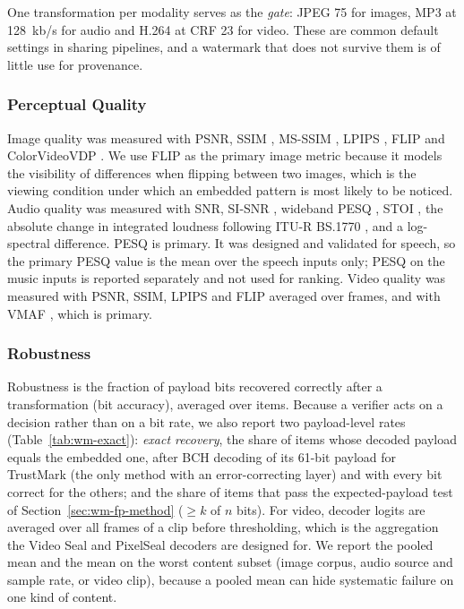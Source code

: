 One transformation per modality serves as the \emph{gate}: JPEG 75 for images, MP3 at 128~kb/s for audio and H.264 at CRF 23 for video. These are common default settings in sharing pipelines, and a watermark that does not survive them is of little use for provenance.

\subsubsection{Perceptual Quality}
Image quality was measured with PSNR, SSIM \cite{wang2004ssim}, MS-SSIM \cite{wang2003msssim}, LPIPS \cite{zhang2018lpips}, FLIP \cite{andersson2020flip} and ColorVideoVDP \cite{mantiuk2024cvvdp}. We use FLIP as the primary image metric because it models the visibility of differences when flipping between two images, which is the viewing condition under which an embedded pattern is most likely to be noticed. Audio quality was measured with SNR, SI-SNR \cite{leroux2019sdr}, wideband PESQ \cite{itu2007p8622}, STOI \cite{taal2011stoi}, the absolute change in integrated loudness following ITU-R BS.1770 \cite{itu2023bs1770}, and a log-spectral difference. PESQ is primary. It was designed and validated for speech, so the primary PESQ value is the mean over the  speech inputs only; PESQ on the  music inputs is reported separately and not used for ranking. Video quality was measured with PSNR, SSIM, LPIPS and FLIP averaged over frames, and with VMAF \cite{rassool2017vmaf}, which is primary.

\subsubsection{Robustness}
Robustness is the fraction of payload bits recovered correctly after a transformation (bit accuracy), averaged over items. Because a verifier acts on a decision rather than on a bit rate, we also report two payload-level rates (Table~\ref{tab:wm-exact}): \emph{exact recovery}, the share of items whose decoded payload equals the embedded one, after BCH decoding of its 61-bit payload for TrustMark (the only method with an error-correcting layer) and with every bit correct for the others; and the share of items that pass the expected-payload test of Section~\ref{sec:wm-fp-method} ($\geq k$ of $n$ bits). For video, decoder logits are averaged over all frames of a clip before thresholding, which is the aggregation the Video Seal and PixelSeal decoders are designed for. We report the pooled mean and the mean on the worst content subset (image corpus, audio source and sample rate, or video clip), because a pooled mean can hide systematic failure on one kind of content.

